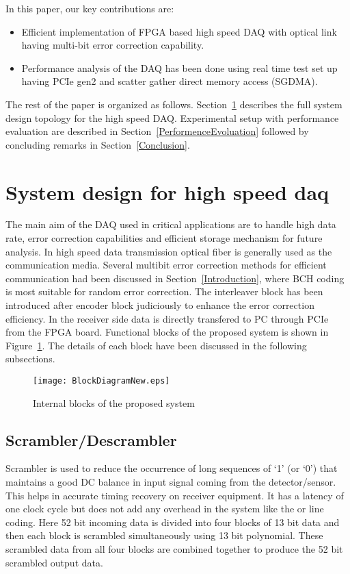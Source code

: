\documentclass[10pt, conference, compsocconf]{IEEEtran}
\begin{document}
In this paper, our key contributions are:
\begin{itemize}
\item Efficient implementation of FPGA based high speed DAQ with optical link having multi-bit error correction capability.
\item Performance analysis of the DAQ has been done using real time test set up having PCIe gen2 and scatter gather direct memory access (SGDMA).
\end{itemize}   
The rest of the paper is organized as follows. Section~\ref{SystemDesignDAQ} describes the full system design topology for the high speed DAQ. Experimental setup with performance evaluation are described in Section~\ref{PerformenceEvoluation} followed by concluding remarks in Section~\ref{Conclusion}.

\section{System design for high speed daq}\label{SystemDesignDAQ}
The main aim of the DAQ used in critical applications are to handle high data rate, error correction capabilities and efficient storage mechanism for future analysis. In high speed data transmission optical fiber is generally used as the communication media. Several multibit error correction methods for efficient communication had been discussed in Section~\ref{Introduction}, where BCH coding is most suitable for random error correction. The interleaver block has been introduced after encoder block judiciously to enhance the error correction efficiency. In the receiver side data is directly transfered to PC through PCIe from the FPGA board. Functional blocks of the proposed system is shown in Figure~\ref{fig:BlockDiagramFlow}. The details of each block have been discussed in the following subsections. 
\begin{figure}[!htb]	
\hspace{-20 pt}
\vspace{-5pt}
\texttt{[image: BlockDiagramNew.eps]}
\caption{Internal blocks of the proposed system}
\vspace{-15pt}
\label{fig:BlockDiagramFlow}
\end{figure}
\subsection{Scrambler/Descrambler} Scrambler is used to reduce the occurrence of long sequences of `1' (or `0') that maintains a good DC balance in input signal coming from the detector/sensor. This helps in accurate timing recovery on receiver equipment. It has a latency of one clock cycle but does not add any overhead in the system like the  or  line coding. Here 52 bit incoming data is divided into four blocks of 13 bit data and then each block is scrambled simultaneously using 13 bit polynomial. These scrambled data from all four blocks are combined together to produce the 52 bit scrambled output data. 
\end{document}
